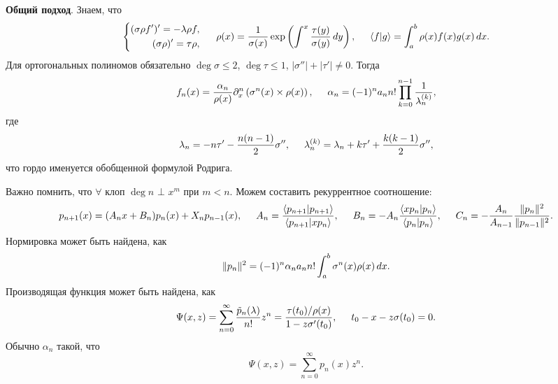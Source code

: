 
\textbf{Общий подход}. 
Знаем, что
\begin{equation*}
    \left\{\begin{aligned}
        (\sigma \rho f')' = - \lambda \rho f, \\
        (\sigma \rho)' =  \tau \rho,
    \end{aligned}\right.
    \hspace{5 mm} 
    \rho(x) = \frac{1}{\sigma(x)} \exp\left(
        \int_{}^{x} \frac{\tau(y)}{\sigma(y)} \d y
    \right),
    \hspace{5 mm} 
    \bk{f}{g} = \int_{a}^{b} \rho(x) f(x) g(x) \d x.
\end{equation*}
Для ортогональных полиномов обязательно $\deg \sigma \leq 2$, $\deg \tau \leq 1$, $|\sigma''|+ |\tau'| \neq 0$. Тогда
\begin{equation*}
    f_n (x) = \frac{\alpha_n}{\rho(x)} \partial_x^n \left(\sigma^n (x) \times \rho(x)\right), \hspace{5 mm}     
    \alpha_n = (-1)^n a_n n! \prod_{k=0}^{n-1} \frac{1}{\lambda_n^{(k)}},
\end{equation*}
где 
\begin{equation*}
    \lambda_n = - n \tau' - \frac{n (n-1)}{2} \sigma'',
    \hspace{5 mm} 
    \lambda_n^{(k)} = \lambda_n + k \tau' + \frac{k (k-1)}{2} \sigma'',
\end{equation*}
что гордо именуется обобщенной формулой Родрига. 

Важно помнить, что $\forall$ клоп $\deg n$ $\bot$ $x^m$ при $m < n$. Можем составить рекуррентное соотношение:
\begin{equation*}
    p_{n+1} (x) = (A_n x + B_n) p_n (x) + X_n p_{n-1} (x),
    \hspace{5 mm} 
    A_n = \frac{
        \bk{p_{n+1}}{p_{n+1}}
    }{
        \bk{p_{n+1}}{x p_n}
    },
    \hspace{5 mm} 
    B_n = -A_n \frac{\bk{x p_n}{p_n}}{\bk{p_n}{p_n}},
    \hspace{5 mm} 
    C_n = - \frac{A_n}{A_{n-1}} \frac{\|p_n\|^2}{\|p_{n-1}\|^2}.
\end{equation*}
Нормировка может быть найдена, как
\begin{equation*}
    \|p_n\|^2 = (-1)^n \alpha_n a_n n! \int_{a}^{b} \sigma^n (x) \rho(x) \, d x.
\end{equation*}
Производящая функция может быть найдена, как
\begin{equation*}
    \Psi(x, z) = \sum_{n=0}^{\infty}  \frac{\tilde{p}_n (\lambda)}{n!} z^n = 
    \frac{\tau(t_0)/ \rho(x)}{1 - z \sigma' (t_0)},
    \hspace{5 mm} 
    t_0 - x -  z \sigma(t_0) = 0.
\end{equation*}
Обычно $\alpha_n$ такой, что
\begin{equation*}
    \Psi(x, z) = \sum_{n=0}^{\infty} p_n (x) z^n.
\end{equation*}



